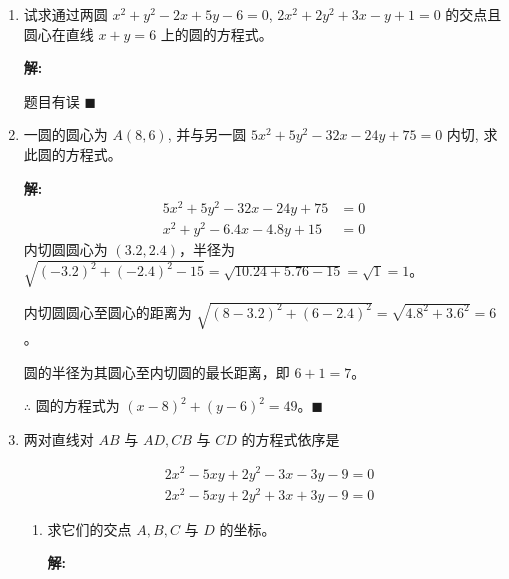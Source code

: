 \documentclass[10pt]{article}
\newcommand{\sol}{\textbf{解:} }
\begin{document}
\begin{enumerate}[leftmargin=*]
        \sol{}

        题目有误 \hfill$\blacksquare$

  \item 试求通过两圆 $x^{2}+y^{2}-2 x+5 y-6=0$, $2 x^{2}+2 y^{2}+3 x-y+1=0$ 的交点且圆心在直线 $x+y=6$ 上的圆的方程式。

        \sol{}

        题目有误 \hfill$\blacksquare$


  \item 一圆的圆心为 $A(8,6)$, 并与另一圆 $5 x^{2}+5 y^{2}-32 x-24 y+75=0$ 内切, 求此圆的方程式。

        \sol{}
        \begin{align*}
          5 x^{2}+5 y^{2}-32 x-24 y+75 & = 0 \\
          x^{2}+y^{2}-6.4 x-4.8 y+15   & = 0
        \end{align*}
        内切圆圆心为 $(3.2, 2.4)$，半径为 $\sqrt{(-3.2)^2 + (-2.4)^2 - 15} = \sqrt{10.24 + 5.76 - 15} = \sqrt{1} = 1$。

        内切圆圆心至圆心的距离为 $\sqrt{(8-3.2)^2 + (6-2.4)^2} = \sqrt{4.8^2 + 3.6^2} = 6$。

        圆的半径为其圆心至内切圆的最长距离，即 $6 + 1 = 7$。

        $\therefore$ 圆的方程式为 $(x-8)^{2} + (y-6)^{2} = 49$。\hfill$\blacksquare$

  \item 两对直线对 $AB$ 与 $AD, CB$ 与 $CD$ 的方程式依序是

        $$
          \begin{aligned}
             & 2 x^{2}-5 x y+2 y^{2}-3 x-3 y-9=0 \\
             & 2 x^{2}-5 x y+2 y^{2}+3 x+3 y-9=0
          \end{aligned}
        $$

        \begin{enumerate}
          \item 求它们的交点 $A, B, C$ 与 $D$ 的坐标。

                \sol{}


\end{enumerate}
\end{enumerate}
\end{document}
